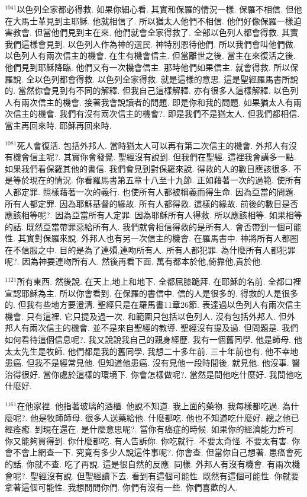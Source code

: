 \documentclass{book}
\begin{document}
$^{1041}$以色列全家都必得救.
如果你細心看.
其實和保羅的情況一樣.
保羅不相信.
但他在大馬士革見到主耶穌.
他就相信了.
所以猶太人他們不相信.
他們好像保羅一樣迫害教會.
但當他們見到主在來.
他們就會全家得救了.
全部以色列人都會得救.
其實我們這樣會見到.
以色列人作為神的選民.
神特別恩待他們.
所以我們會叫他們做.
以色列人有兩次信主的機會.
在生有機會信主.
但當離世之後.
當主在來復活之後.
他們見到耶穌降臨.
他們又有一次機會信主.
那時他們如果信主.
就會得救.
所以保羅說.
全以色列都會得救.
以色列全家得救.
就是這樣的意思.
這是聖經羅馬書所說的.
當然你會見到有不同的解釋.
但我自己這樣解釋.
亦有很多人這樣解釋.
以色列人有兩次信主的機會.
接著我會說讀者的問題.
即是你和我的問題.
如果猶太人有兩次信主的機會.
我們有沒有兩次信主的機會?.
即是我們不是猶太人.
但我們都相信.
當主再回來時.
耶穌再回來時.

$^{1081}$死人會復活.
包括外邦人.
當時猶太人可以再有第二次信主的機會.
外邦人有沒有機會信主呢?.
其實你會發覺.
聖經沒有說到.
但我們在聖經.
這裡我會講多一點.
如果我們看保羅其他的書信.
我們會見到對保羅來說.
得救的人的數目應該很多.
不是等於現在的情況.
你看羅馬書第五章十八至十九節.
正如藉著一次的過範.
使所有人都定罪.
照樣藉著一次的義行.
也使所有人都被稱義而得生命.
因為亞當的問題.
所有人都定罪.
因為耶穌基督的緣故.
所有人都得救.
這樣的緣故.
前後的數目是否應該相等呢?.
因為亞當所有人定罪.
因為耶穌所有人得救.
所以應該相等.
如果相等的話.
既然亞當帶罪惡給所有人.
我們就會相信得救的是所有人.
會否帶到一個可能性.
其實對保羅來說.
外邦人也有另一次信主的機會.
在羅馬書中.
神將所有人都圈在不信服之中.
目的是為了連殞,連吻所有人.
所有人都犯罪.
為什麼所有人都犯罪呢?.
因為神要連吻所有人.
然後再看下面.
萬有都本於他,倚靠他,貴於他.

$^{1121}$所有東西.
然後說.
在天上,地上和地下.
全都屈膝跪拜.
在耶穌的名前.
全都口裡宣認耶穌為主.
所以你會看到.
在保羅的書信中.
信的人是很多的.
得救的人是很多的.
但我有些地方要澄清.
聖經只是在羅馬書11章26節.
表達過以色列人有兩次信主機會.
只有這裡.
它只提及過一次.
和範圍只包括以色列人.
沒有包括外邦人.
但外邦人有兩次信主的機會.
並不是來自聖經的教導.
聖經沒有提及過.
但問題是.
我們如何看待這個信息呢?.
我又說說我自己的親身經歷.
我有一個舊同學.
他是師母.
他太太先生是牧師.
他們都是我的舊同學.
我想二十多年前.
三十年前也有.
他不幸地患癌.
但我不是經常見他.
但知道他患癌.
沒有見他一段時間後.
就見他.
他沒事.
醫治得很好.
當你處於這樣的環境下.
你會怎樣做呢?.
當然是問他吃什麼好.
我問他吃什麼好.

$^{1161}$在他家裡.
他指著玻璃的酒櫃.
他說不知道.
我上面的藥物.
我每樣都吃過.
為什麼呢?.
他是牧師師母.
很多人送藥給他.
什麼都吃.
他也不知道吃什麼好.
總之他已經痊癒.
到現在還在.
是什麼意思呢?.
當你有癌症的時候.
如果你的經濟能力許可.
你又能夠買得到.
你什麼都吃.
有人告訴你.
你吃就行.
不要太奇怪.
不要太有害.
你會不會上網查一下.
究竟有多少人說這件事呢?.
你會查.
但當你自己想著.
患癌會死的話.
你就不查.
吃了再說.
這是很自然的反應.
同樣.
外邦人有沒有機會.
有兩次機會呢?.
聖經沒有說.
但聖經讀下去.
看到有這個可能性.
既然有這個可能性.
你就要拿著這個可能性.
我想問問你們.
你們有沒有一些.
你們喜歡的人.
\end{document}
